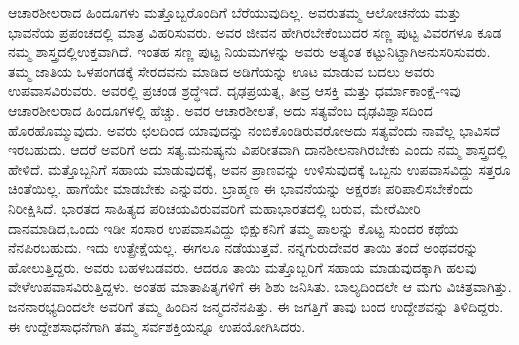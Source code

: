 ಆಚಾರಶೀಲರಾದ ಹಿಂದೂಗಳು ಮತ್ತೊಬ್ಬರೊಂದಿಗೆ ಬೆರೆಯುವುದಿಲ್ಲ. ಅವರು\break ತಮ್ಮ ಆಲೋಚನೆಯ ಮತ್ತು ಭಾವನೆಯ ಪ್ರಪಂಚದಲ್ಲಿ ಮಾತ್ರ ವಿಹರಿಸುವರು. ಅವರ ಜೀವನ ಹೇಗಿರಬೇಕೆಂಬುದರ ಸಣ್ಣ ಪುಟ್ಟ ವಿವರಗಳೂ ಕೂಡ ನಮ್ಮ ಶಾಸ್ತ್ರದಲ್ಲಿ\break ಉಕ್ತವಾಗಿದೆ. ಇಂತಹ ಸಣ್ಣ ಪುಟ್ಟ ನಿಯಮಗಳನ್ನು ಅವರು ಅತ್ಯಂತ ಕಟ್ಟುನಿಟ್ಟಾಗಿ\break ಅನುಸರಿಸುವರು. ತಮ್ಮ ಜಾತಿಯ ಒಳಪಂಗಡಕ್ಕೆ ಸೇರದವನು ಮಾಡಿದ ಅಡಿಗೆಯನ್ನು ಊಟ ಮಾಡುವ ಬದಲು ಅವರು ಉಪವಾಸವಿರುವರು. ಅವರಲ್ಲಿ ಪ್ರಚಂಡ ಶ್ರದ್ಧೆ\break ಇದೆ. ದೃಢಪ್ರಯತ್ನ, ತೀವ್ರ ಆಸಕ್ತಿ ಮತ್ತು ಧರ್ಮಾಕಾಂಕ್ಷೆ-ಇವು ಆಚಾರಶೀಲರಾದ ಹಿಂದೂಗಳಲ್ಲಿ ಹೆಚ್ಚು. ಅವರ ಆಚಾರಶೀಲತೆ, ಅದು ಸತ್ಯವೆಂಬ ದೃಢವಿಶ್ವಾಸದಿಂದ ಹೊರಹೊಮ್ಮುವುದು. ಅವರು ಛಲದಿಂದ ಯಾವುದನ್ನು ನಂಬಿಕೊಂಡಿರುವರೋ\break ಅದು ಸತ್ಯವೆಂದು ನಾವೆಲ್ಲ ಭಾವಿಸದೆ ಇರಬಹುದು. ಆದರೆ ಅವರಿಗೆ ಅದು ಸತ್ಯ.\break ಮನುಷ್ಯನು ವಿಪರೀತವಾಗಿ ದಾನಶೀಲನಾಗಿರಬೇಕು ಎಂದು ನಮ್ಮ ಶಾಸ್ತ್ರದಲ್ಲಿ ಹೇಳಿದೆ. ಮತ್ತೊಬ್ಬನಿಗೆ ಸಹಾಯ ಮಾಡುವುದಕ್ಕೆ, ಅವನ ಪ್ರಾಣವನ್ನು ಉಳಿಸುವುದಕ್ಕೆ ಒಬ್ಬನು ಉಪವಾಸವಿದ್ದು ಸತ್ತರೂ ಚಿಂತೆಯಿಲ್ಲ. ಹಾಗೆಯೇ ಮಾಡಬೇಕು ಎನ್ನುವರು. ಬ್ರಾಹ್ಮಣ ಈ ಭಾವನೆಯನ್ನು ಅಕ್ಷರಶಃ ಪರಿಪಾಲಿಸಬೇಕೆಂದು ನಿರೀಕ್ಷಿಸಿದೆ. ಭಾರತದ ಸಾಹಿತ್ಯದ ಪರಿಚಯವಿರುವವರಿಗೆ ಮಹಾಭಾರತದಲ್ಲಿ ಬರುವ, ಮೇರೆಮೀರಿ ದಾನಮಾಡಿದ,\break ಒಂದು ಇಡೀ ಸಂಸಾರ ಉಪವಾಸವಿದ್ದು ಭಿಕ್ಷುಕನಿಗೆ ತಮ್ಮ ಪಾಲನ್ನು ಕೊಟ್ಟ ಸುಂದರ ಕಥೆಯ ನೆನಪಿರಬಹುದು. ಇದು ಉತ್ಪ್ರೇಕ್ಷೆಯಲ್ಲ. ಈಗಲೂ ನಡೆಯುತ್ತವೆ. ನನ್ನ\break ಗುರುದೇವರ ತಾಯಿ ತಂದೆ ಅಂಥವರನ್ನು ಹೋಲುತ್ತಿದ್ದರು. ಅವರು ಬಹಳ\break ಬಡವರು. ಆದರೂ ತಾಯಿ ಮತ್ತೊಬ್ಬರಿಗೆ ಸಹಾಯ ಮಾಡುವುದಕ್ಕಾಗಿ ಹಲವು ವೇಳೆ\break ಉಪವಾಸವಿರುತ್ತಿದ್ದಳು. ಅಂತಹ ಮಾತಾಪಿತೃಗಳಿಗೆ ಈ ಶಿಶು ಜನಿಸಿತು. ಬಾಲ್ಯದಿಂದಲೇ ಆ ಮಗು ವಿಚಿತ್ರವಾಗಿತ್ತು. ಜನನಾರಭ್ಯದಿಂದಲೇ ಅವರಿಗೆ ತಮ್ಮ ಹಿಂದಿನ ಜನ್ಮದ\break ನೆನಪಿತ್ತು. ಈ ಜಗತ್ತಿಗೆ ತಾವು ಬಂದ ಉದ್ದೇಶವನ್ನು ತಿಳಿದಿದ್ದರು. ಈ ಉದ್ದೇಶ\break ಸಾಧನೆಗಾಗಿ ತಮ್ಮ ಸರ್ವಶಕ್ತಿಯನ್ನೂ ಉಪಯೋಗಿಸಿದರು.

